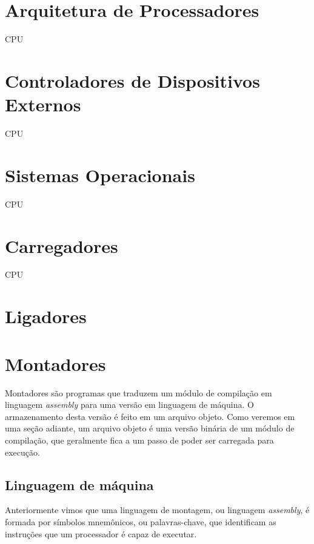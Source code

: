 \section{Arquitetura de Processadores}

CPU

\section{Controladores de Dispositivos Externos}

CPU

\section{Sistemas Operacionais}

CPU

\section{Carregadores}

CPU

\section{Ligadores}



\section{Montadores}

Montadores são programas que traduzem um módulo de compilação em linguagem \textit{assembly} para uma versão em linguagem de máquina. O armazenamento desta versão é feito em um arquivo objeto. Como veremos em uma seção adiante, um arquivo objeto é uma versão binária de um módulo de compilação, que geralmente fica a um passo de poder ser carregada para execução.

\subsection{Linguagem de máquina}

Anteriormente vimos que uma linguagem de montagem, ou linguagem \textit{assembly}, é formada por símbolos mnemônicos, ou palavras-chave, que identificam as instruções que um processador é capaz de executar.

